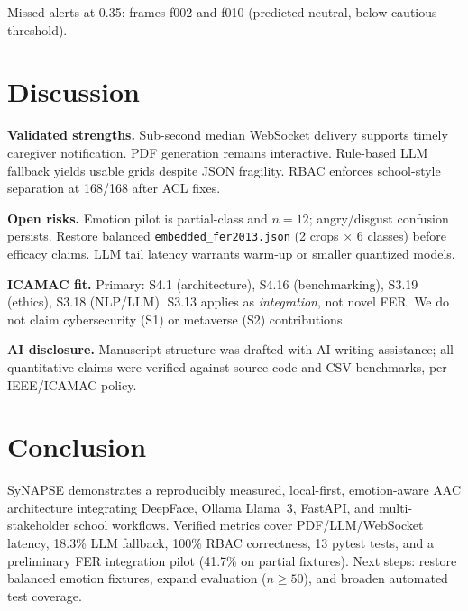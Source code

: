 \documentclass[conference]{IEEEtran}
\begin{document}
Missed alerts at 0.35: frames f002 and f010 (predicted neutral, below cautious threshold).

\section{Discussion}
\textbf{Validated strengths.} Sub-second median WebSocket delivery supports timely caregiver notification. PDF generation remains interactive. Rule-based LLM fallback yields usable grids despite JSON fragility. RBAC enforces school-style separation at 168/168 after ACL fixes.

\textbf{Open risks.} Emotion pilot is partial-class and $n{=}12$; angry/disgust confusion persists. Restore balanced \texttt{embedded\_fer2013.json} (2 crops $\times$ 6 classes) before efficacy claims. LLM tail latency warrants warm-up or smaller quantized models.

\textbf{ICAMAC fit.} Primary: S4.1 (architecture), S4.16 (benchmarking), S3.19 (ethics), S3.18 (NLP/LLM). S3.13 applies as \emph{integration}, not novel FER. We do not claim cybersecurity (S1) or metaverse (S2) contributions.

\textbf{AI disclosure.} Manuscript structure was drafted with AI writing assistance; all quantitative claims were verified against source code and CSV benchmarks, per IEEE/ICAMAC policy.

\section{Conclusion}
SyNAPSE demonstrates a reproducibly measured, local-first, emotion-aware AAC architecture integrating DeepFace, Ollama Llama~3, FastAPI, and multi-stakeholder school workflows. Verified metrics cover PDF/LLM/WebSocket latency, 18.3\% LLM fallback, 100\% RBAC correctness, 13 pytest tests, and a preliminary FER integration pilot (41.7\% on partial fixtures). Next steps: restore balanced emotion fixtures, expand evaluation ($n{\geq}50$), and broaden automated test coverage.
\end{document}
